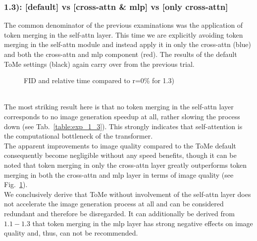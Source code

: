 \subsubsection*{1.3): [default] vs [cross-attn \& mlp] vs [only cross-attn]}
The common denominator of the previous examinations was the application of token merging in the self-attn layer. This time we are explicitly avoiding token merging in the self-attn module and instead apply it in only the cross-attn (blue) and both the cross-attn and mlp component (red).
The results of the default ToMe settings (black) again carry over from the previous trial.\\
\begin{figure}[!htb]
    
    
\caption{FID and relative time compared to r=0\% for 1.3)}
\label{fig:exp_1_3}
\end{figure}\\
The most striking result here is that no token merging in the self-attn layer corresponds to no image generation speedup at all, rather slowing the process down (see Tab.~\ref{table:exp_1_3}). This strongly indicates that self-attention is the computational bottleneck of the transformer.\\
The apparent improvements to image quality compared to the ToMe default consequently become negligible without any speed benefits, though it can be noted that token merging in only the cross-attn layer greatly outperforms token merging in both the cross-attn and mlp layer in terms of image quality (see Fig.~\ref{fig:exp_1_3}).\\
We conclusively derive that ToMe without involvement of the self-attn layer does not accelerate the image generation process at all and can be considered redundant and therefore be disregarded. It can additionally be derived from \(1.1 - 1.3\) that token merging in the mlp layer has strong negative effects on image quality and, thus, can not be recommended.



